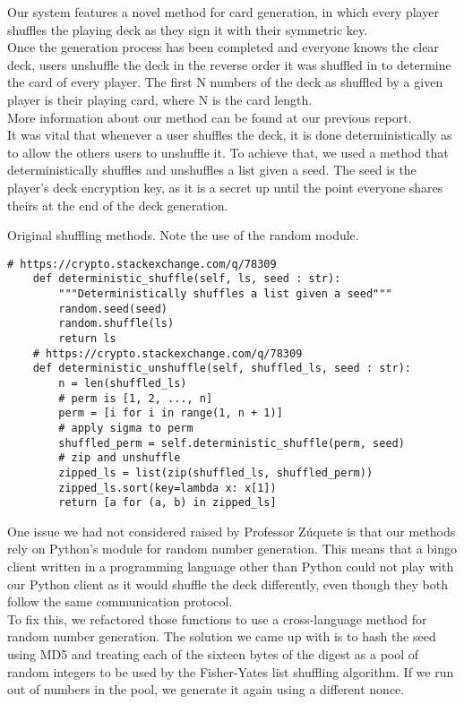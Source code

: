\documentclass[11pt]{article}
\begin{document}
Our system features a novel method for card generation, in which every player shuffles the playing deck as they sign it with their symmetric key.\\
Once the generation process has been completed and everyone knows the clear deck, users unshuffle the deck in the reverse order it was shuffled in to determine the card of every player. The first N numbers of the deck as shuffled by a given player is their playing card, where N is the card length.\\
More information about our method can be found at our previous report.\\
It was vital that whenever a user shuffles the deck, it is done deterministically as to allow the others users to unshuffle it. To achieve that, we used a method that deterministically shuffles and unshuffles a list given a seed. The seed is the player’s deck encryption key, as it is a secret up until the point everyone shares theirs at the end of the deck generation.\\
\begin{Large}
Original shuffling methods. Note the use of the random module.
\end{Large}
\begin{lstlisting}[captionpos=b label=listing:sparql_getallindividuals,
   basicstyle=\ttfamily]
    # https://crypto.stackexchange.com/q/78309
    def deterministic_shuffle(self, ls, seed : str):
        """Deterministically shuffles a list given a seed""" 
        random.seed(seed)
        random.shuffle(ls)
        return ls
    # https://crypto.stackexchange.com/q/78309
    def deterministic_unshuffle(self, shuffled_ls, seed : str):
        n = len(shuffled_ls)
        # perm is [1, 2, ..., n]
        perm = [i for i in range(1, n + 1)]
        # apply sigma to perm
        shuffled_perm = self.deterministic_shuffle(perm, seed)
        # zip and unshuffle
        zipped_ls = list(zip(shuffled_ls, shuffled_perm))
        zipped_ls.sort(key=lambda x: x[1])
        return [a for (a, b) in zipped_ls]
\end{lstlisting}
One issue we had not considered raised by Professor Zúquete is that our methods rely on Python’s module for random number generation. This means that a bingo client written in a programming language other than Python could not play with our Python client as it would shuffle the deck differently, even though they both follow the same communication protocol.\\
To fix this, we refactored those functions to use a cross-language method for random number generation. The solution we came up with is to hash the seed using MD5 and treating each of the sixteen bytes of the digest as a pool of random integers to be used by the Fisher-Yates list shuffling algorithm. If we run out of numbers in the pool, we generate it again using a different nonce.\\
\end{document}
